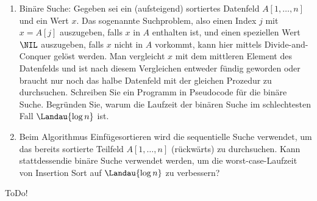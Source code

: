 
\begin{exercise}

\phantom{}

\begin{enumerate}[label = (\alph*)]

    \item Binäre Suche:
    Gegeben sei ein (aufsteigend) sortiertes Datenfeld $A[1, \ldots, n]$ und ein Wert $x$.
    Das sogenannte Suchproblem, also einen Index $j$ mit $x = A[j]$ auszugeben, falls $x$ in $A$ enthalten ist, und einen speziellen Wert $\NIL$ auszugeben, falls $x$ nicht in $A$ vorkommt, kann hier mittels Divide-and-Conquer gelöst werden.
    Man vergleicht $x$ mit dem mittleren Element des Datenfelds und ist nach diesem Vergleichen entweder fündig geworden oder braucht nur noch das halbe Datenfeld mit der gleichen Prozedur zu durchsuchen.
    Schreiben Sie ein Programm in Pseudocode für die binäre Suche.
    Begründen Sie, warum die Laufzeit der binären Suche im schlechtesten Fall $\Landau{\log{n}}$ ist.

    \item Beim Algorithmus Einfügesortieren wird die sequentielle Suche verwendet, um das bereits sortierte Teilfeld $A[1, \ldots, n]$ (rückwärts) zu durchsuchen.
    Kann stattdessendie binäre Suche verwendet werden, um die worst-case-Laufzeit von Insertion Sort auf $\Landau{\log{n}}$ zu verbessern?

\end{enumerate}

\end{exercise}


\begin{solution}

ToDo!

\end{solution}

